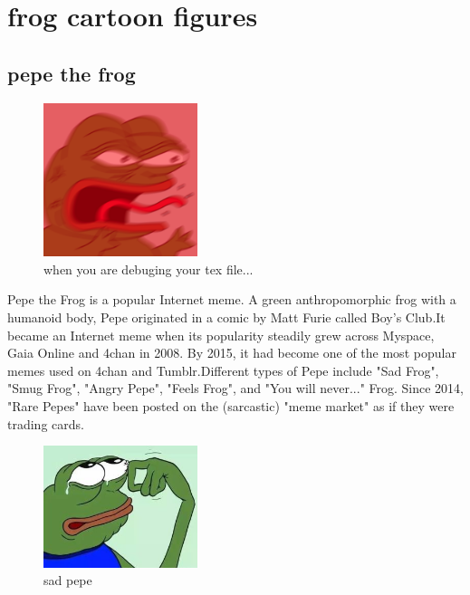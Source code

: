 
\section{frog cartoon figures}
\subsection{pepe the frog}
\begin{figure}[h]
\begin{center}
\includegraphics[width=0.4\textwidth]{frog/image/angry.png} 
\caption{when you are debuging your tex file...}
\label{figurezzzz}
\end{center}
\end{figure}
Pepe the Frog is a popular Internet meme. A green anthropomorphic frog with a humanoid body, Pepe originated in a comic by Matt Furie called Boy's Club.It became an Internet meme when its popularity steadily grew across Myspace, Gaia Online and 4chan in 2008. By 2015, it had become one of the most popular memes used on 4chan and Tumblr.Different types of Pepe include "Sad Frog", "Smug Frog", "Angry Pepe", "Feels Frog", and "You will never..." Frog. Since 2014, "Rare Pepes" have been posted on the (sarcastic) "meme market" as if they were trading cards.
\begin{figure}[h]
\begin{center}
\includegraphics[width=0.4\textwidth]{frog/image/frog.jpg} %
\caption{sad pepe}
\label{figurezzzz}
\end{center}
\end{figure}

